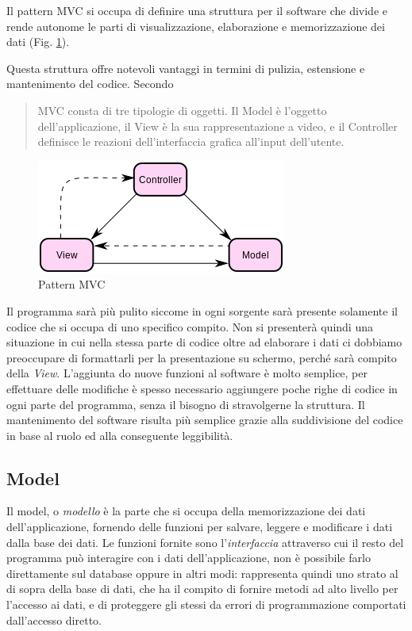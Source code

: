Il pattern MVC si occupa di definire una struttura per il software che divide e rende autonome le parti di visualizzazione, elaborazione e memorizzazione dei dati (Fig. \ref{img:mvc}).

Questa struttura offre notevoli vantaggi in termini di pulizia, estensione e mantenimento del codice. Secondo \cite[p. 4]{designpatterns}
\begin{quote}
MVC consta di tre tipologie di oggetti. Il Model è l'oggetto dell'applicazione, il View è la sua rappresentazione a video, e il Controller definisce le reazioni dell'interfaccia grafica all'input dell'utente.
\end{quote}

\begin{figure}[ht!]
	\caption{Pattern MVC}
	\label{img:mvc}
	\centering
		\includegraphics[width=\textwidth]{img/mvc1.png}
\end{figure}

Il programma sarà più pulito siccome in ogni sorgente sarà presente solamente il codice che si occupa di uno specifico compito. Non si presenterà quindi una situazione in cui nella stessa parte di codice oltre ad elaborare i dati ci dobbiamo preoccupare di formattarli per la presentazione su schermo, perché sarà compito della \emph{View}. L'aggiunta do nuove funzioni al software è molto semplice, per effettuare delle modifiche è spesso necessario aggiungere poche righe di codice in ogni parte del programma, senza il bisogno di stravolgerne la struttura. Il mantenimento del software risulta più semplice grazie alla suddivisione del codice in base al ruolo ed alla conseguente leggibilità.


\subsection{Model}
Il model, o \emph{modello} è la parte che si occupa della memorizzazione dei dati dell'applicazione, fornendo delle funzioni per salvare, leggere e modificare i dati dalla base dei dati. Le funzioni fornite sono l'\emph{interfaccia} attraverso cui il resto del programma può interagire con i dati dell'applicazione, non è possibile farlo direttamente sul database oppure in altri modi: rappresenta quindi uno strato al di sopra della base di dati, che ha il compito di fornire metodi ad alto livello per l'accesso ai dati, e di proteggere gli stessi da errori di programmazione comportati dall'accesso diretto.


